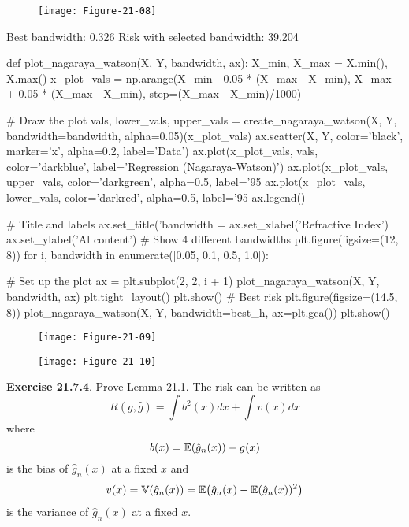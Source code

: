 \begin{figure}[H]
\centering
\texttt{[image: Figure-21-08]}
\end{figure}

\begin{console}
Best bandwidth:                 0.326
Risk with selected bandwidth:   39.204
\end{console}

\begin{python}
def plot_nagaraya_watson(X, Y, bandwidth, ax):
    X_min, X_max = X.min(), X.max()
    x_plot_vals = np.arange(X_min - 0.05 * (X_max - X_min), 
                            X_max + 0.05 * (X_max - X_min), 
                            step=(X_max - X_min)/1000)
      
    # Draw the plot
    vals, lower_vals, upper_vals = create_nagaraya_watson(X, Y, 
        bandwidth=bandwidth, 
        alpha=0.05)(x_plot_vals)
    ax.scatter(X, Y, color='black', marker='x', alpha=0.2, label='Data')
    ax.plot(x_plot_vals, vals, color='darkblue', label='Regression (Nagaraya-Watson)')
    ax.plot(x_plot_vals, upper_vals, color='darkgreen', alpha=0.5, label='95%
    ax.plot(x_plot_vals, lower_vals, color='darkred', alpha=0.5, label='95%
    ax.legend()
    
    # Title and labels
    ax.set_title('bandwidth = %
    ax.set_xlabel('Refractive Index')    
    ax.set_ylabel('Al content')
# Show 4 different bandwidths
plt.figure(figsize=(12, 8))
for i, bandwidth in enumerate([0.05, 0.1, 0.5, 1.0]):
    
    # Set up the plot
    ax = plt.subplot(2, 2, i + 1)
    plot_nagaraya_watson(X, Y, bandwidth, ax)
plt.tight_layout()
plt.show()
# Best risk
plt.figure(figsize=(14.5, 8))
plot_nagaraya_watson(X, Y, bandwidth=best_h, ax=plt.gca())
plt.show()
\end{python}

\begin{figure}[H]
\centering
\texttt{[image: Figure-21-09]}
\end{figure}

\begin{figure}[H]
\centering
\texttt{[image: Figure-21-10]}
\end{figure}


\textbf{Exercise 21.7.4}. Prove Lemma 21.1.
The risk can be written as
\[
R(g, \hat{g}) = \int b^{2}(x) dx + \int v(x) dx
\]
where
\[
b(x) = \operatorname{\mathbb{E}}(\hat{g}_{n}(x)) - g(x)
\]
is the bias of \(\hat{g}_{n}(x)\) at a fixed \(x\) and
\[
v(x) = \VAR(\hat{g}_{n}(x)) = \EXP\left( \hat{g}_{n}(x) - \EXP(\hat{g}_{n}(x))^{2}\right)
\]
is the variance of \(\hat{g}_{n}(x)\) at a fixed \(x\).

